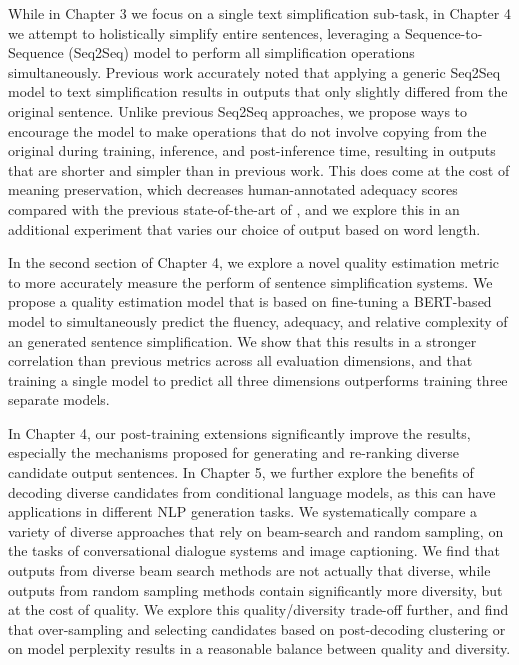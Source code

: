 \documentclass[thesis.tex]{subfiles}
\begin{document}
While in Chapter 3 we focus on a single text simplification sub-task, in Chapter 4 we attempt to holistically simplify entire sentences, leveraging a Sequence-to-Sequence (Seq2Seq) model to perform all simplification operations simultaneously. Previous work accurately noted that applying a generic Seq2Seq model to text simplification results in outputs that only slightly differed from the original sentence. Unlike previous Seq2Seq approaches, we propose ways to encourage the model to make operations that do not involve copying from the original during training, inference, and post-inference time, resulting in outputs that are shorter and simpler than in previous work. This does come at the cost of meaning preservation, which decreases human-annotated adequacy scores compared with the previous state-of-the-art of \cite{zhang2017sentence}, and we explore this in an additional experiment that varies our choice of output based on word length.

In the second section of Chapter 4, we explore a novel quality estimation metric to more accurately measure the perform of sentence simplification systems. We propose a quality estimation model that is based on fine-tuning a BERT-based model \citep{devlin2019bert,xenouleas2019sumqe} to simultaneously predict the fluency, adequacy, and relative complexity of an generated sentence simplification. We show that this results in a stronger correlation than previous metrics across all evaluation dimensions, and that training a single model to predict all three dimensions outperforms training three separate models.

In Chapter 4, our post-training extensions significantly improve the results, especially the mechanisms proposed for generating and re-ranking diverse candidate output sentences. In Chapter 5, we further explore the benefits of decoding diverse candidates from conditional language models, as this can have applications in different NLP generation tasks. We systematically compare a variety of diverse approaches that rely on beam-search and random sampling, on the tasks of conversational dialogue systems and image captioning. We find that outputs from diverse beam search methods are not actually that diverse, while outputs from random sampling methods contain significantly more diversity, but at the cost of quality.  We explore this quality/diversity trade-off further, and find that over-sampling and selecting candidates based on post-decoding clustering or on model perplexity results in a reasonable balance between quality and diversity.
\end{document}
